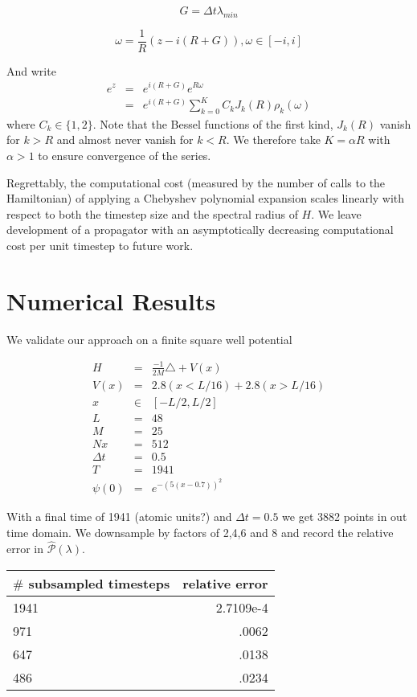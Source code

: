 \documentclass[12pt]{amsart}
\theoremstyle{remark}
\begin{document}
$$
G = \Delta t \lambda_{min}
$$

$$
\omega = \frac{1}{R}(z - i(R+G)),\omega \in [-i,i]
$$

And write
\begin{eqnarray}
e^{z} & = & e^{i(R+G)}e^{R\omega} \\
& = & e^{i(R+G)}\sum_{k=0}^K C_k J_k(R) \rho_k(\omega)
\end{eqnarray}
where $C_k \in \{1,2 \} $. Note that the Bessel functions of the first kind, $J_k(R)$ vanish for $k>R$ and almost never vanish for $k<R$. We therefore take $K= \alpha R$ with $\alpha >1$ to ensure convergence of the series.

Regrettably, the computational cost (measured by the number of calls to the Hamiltonian) of applying a Chebyshev polynomial expansion scales linearly with respect to both the timestep size and the spectral radius of $H$. We leave development of a propagator with an asymptotically decreasing computational cost per unit timestep to future work.

\section{Numerical Results}

We validate our approach on a finite square well potential

\begin{eqnarray*}
H &=& \frac{-1}{2M}\triangle + V(x) \\
V(x) &=& 2.8(x < L/16) + 2.8(x > L/16) \\ 
x &\in & [-L/2, L/2] \\
L &=& 48\\
M &=& 25\\
Nx &=& 512 \\
\Delta t &=& 0.5 \\
T &=& 1941 \\
\psi(0) &=& e^{-(5(x-0.7))^2}
\end{eqnarray*}

With a final time of 1941 (atomic units?) and $\Delta t = 0.5$ we get 3882 points in out time domain. We downsample by factors of 2,4,6 and 8 and record the relative error in  $\hat{\mathcal{P}}(\lambda)$.


\begin{center}
\begin{tabular}{ l | r  }
  \hline                       
  $\#$ subsampled timesteps & relative error \\ \hline
   1941 & 2.7109e-4 \\
   971 & .0062 \\
   647 & .0138 \\
   486 &  .0234 \\
  \hline  
\end{tabular}
\end{center}
\end{document}
